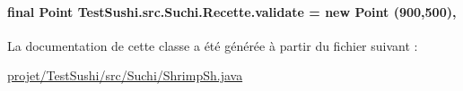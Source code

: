 \paragraph[{validate}]{\setlength{\rightskip}{0pt plus 5cm}final Point Test\+Sushi.\+src.\+Suchi.\+Recette.\+validate = new Point (900,500)\hspace{0.3cm}{\ttfamily [protected]}, {\ttfamily [inherited]}}\label{classTestSushi_1_1src_1_1Suchi_1_1Recette_a9c491e7f09a444817e433e54923e6bca}


La documentation de cette classe a été générée à partir du fichier suivant \+:\begin{DoxyCompactItemize}
\item 
\hyperlink{projet_2TestSushi_2src_2Suchi_2ShrimpSh_8java}{projet/\+Test\+Sushi/src/\+Suchi/\+Shrimp\+Sh.\+java}\end{DoxyCompactItemize}
